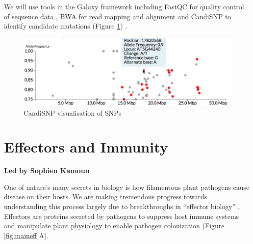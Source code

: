 \documentclass[12pt,]{book}
\theoremstyle{definition}
\theoremstyle{definition}
\theoremstyle{remark}
\begin{document}
We will use tools in the Galaxy \citep{Goecks:2010ea} framework
including FastQC for quality control of sequence data \citep{FastQC},
BWA for read mapping and alignment \citep{Li:2009fi} and CandiSNP
\citep{Etherington:2014ba} to identify candidate mutations (Figure
\ref{fig:candisnp}) .

\begin{figure}
\includegraphics[width=5.77in]{assets/candisnp} \caption{CandiSNP visualisation of SNPs}\label{fig:candisnp}
\end{figure}

\chapter*{Effectors and Immunity}\label{effectors-and-immunity}

\textbf{Led by Sophien Kamoun}

One of nature's many secrets in biology is how filamentous plant
pathogens cause disease on their hosts. We are making tremendous
progress towards understanding this process largely due to breakthroughs
in ``effector biology'' \citep{Hogenhout:2009em, Win:2012jd}. Effectors
are proteins secreted by pathogens to suppress host immune systems and
manipulate plant physiology to enable pathogen colonization (Figure
\ref{fig:maineff}A).
\end{document}

